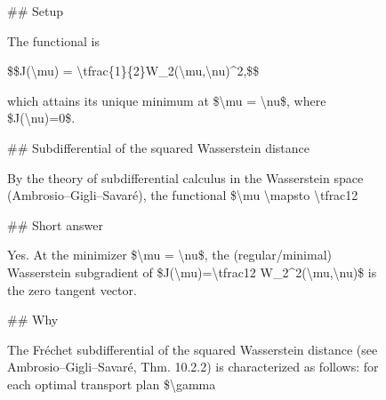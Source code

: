 \begin{figure}[t]
\begin{answercol}[equal height group=ansX3]
  \raggedright \#\# Setup\par\vspace{2pt}
  The functional is\par\vspace{2pt}
  \$\$J(\textbackslash{}mu) = \textbackslash{}tfrac\{1\}\{2\}W\_2(\textbackslash{}mu,\textbackslash{}nu)\textasciicircum{}2,\$\$\par\vspace{2pt}
  which attains its unique minimum at \$\textbackslash{}mu = \textbackslash{}nu\$, where \$J(\textbackslash{}nu)=0\$.\par\vspace{2pt}
  \#\# Subdifferential of the squared Wasserstein distance\par\vspace{2pt}
  By the theory of subdifferential calculus in the Wasserstein space (Ambrosio--Gigli--Savaré), the functional \$\textbackslash{}mu \textbackslash{}mapsto \textbackslash{}tfrac12\par\vspace{3pt}\elide
\end{answercol}\hspace{\columnsep}%
\begin{answercol}[equal height group=ansX3]
  \caret{}\par\vspace{4pt}
  \raggedright \#\# Short answer\par\vspace{2pt}
  Yes. At the minimizer \$\textbackslash{}mu = \textbackslash{}nu\$, the (regular/minimal) Wasserstein subgradient of \$J(\textbackslash{}mu)=\textbackslash{}tfrac12 W\_2\textasciicircum{}2(\textbackslash{}mu,\textbackslash{}nu)\$ is the zero tangent vector.\par\vspace{2pt}
  \#\# Why\par\vspace{2pt}
  The Fréchet subdifferential of the squared Wasserstein distance (see Ambrosio--Gigli--Savaré, Thm. 10.2.2) is characterized as follows: for each optimal transport plan \$\textbackslash{}gamma\par\vspace{3pt}\elide
\end{answercol}\hspace{\columnsep}%
\begin{answercol}[equal height group=ansX3]
  \caret{}\par\vspace{4pt}

\end{answercol}
\end{figure}
